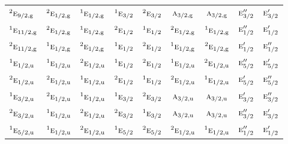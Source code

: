 \documentclass[10pt,a4paper]{article}
\numberwithin{equation}{section}
\newcommand{\irr}[1]{\text{\normalfont\scshape #1}}
\newcommand{\conjpair}[1]{{}^{#1}}
\newcommand{\ptag}[1]{\mathrm{#1}}
\begin{document}
{\begin{longtable}{@{}lcccccccc@{}}
$\conjpair{2}\irr{e}_{9/2,\ptag{g}}$ & $\conjpair{2}\irr{e}_{1/2,\ptag{g}}$ & $\conjpair{1}\irr{e}_{1/2,\ptag{g}}$ & $\conjpair{1}\irr{e}_{3/2}$ & $\conjpair{2}\irr{e}_{3/2}$ & $\irr{a}_{3/2,\ptag{g}}$ & $\irr{a}_{3/2,\ptag{g}}$ & $\irr{e}_{3/2}''$ & $\irr{e}_{3/2}'$\\
$\conjpair{1}\irr{e}_{11/2,\ptag{g}}$ & $\conjpair{2}\irr{e}_{1/2,\ptag{g}}$ & $\conjpair{1}\irr{e}_{1/2,\ptag{g}}$ & $\conjpair{2}\irr{e}_{1/2}$ & $\conjpair{1}\irr{e}_{1/2}$ & $\conjpair{2}\irr{e}_{1/2,\ptag{g}}$ & $\conjpair{1}\irr{e}_{1/2,\ptag{g}}$ & $\irr{e}_{1/2}''$ & $\irr{e}_{1/2}'$\\
$\conjpair{2}\irr{e}_{11/2,\ptag{g}}$ & $\conjpair{1}\irr{e}_{1/2,\ptag{g}}$ & $\conjpair{2}\irr{e}_{1/2,\ptag{g}}$ & $\conjpair{1}\irr{e}_{1/2}$ & $\conjpair{2}\irr{e}_{1/2}$ & $\conjpair{1}\irr{e}_{1/2,\ptag{g}}$ & $\conjpair{2}\irr{e}_{1/2,\ptag{g}}$ & $\irr{e}_{1/2}'$ & $\irr{e}_{1/2}''$\\
$\conjpair{1}\irr{e}_{1/2,\ptag{u}}$ & $\conjpair{1}\irr{e}_{1/2,\ptag{u}}$ & $\conjpair{2}\irr{e}_{1/2,\ptag{u}}$ & $\conjpair{1}\irr{e}_{1/2}$ & $\conjpair{2}\irr{e}_{1/2}$ & $\conjpair{1}\irr{e}_{1/2,\ptag{u}}$ & $\conjpair{2}\irr{e}_{1/2,\ptag{u}}$ & $\irr{e}_{5/2}''$ & $\irr{e}_{5/2}'$\\
$\conjpair{2}\irr{e}_{1/2,\ptag{u}}$ & $\conjpair{2}\irr{e}_{1/2,\ptag{u}}$ & $\conjpair{1}\irr{e}_{1/2,\ptag{u}}$ & $\conjpair{2}\irr{e}_{1/2}$ & $\conjpair{1}\irr{e}_{1/2}$ & $\conjpair{2}\irr{e}_{1/2,\ptag{u}}$ & $\conjpair{1}\irr{e}_{1/2,\ptag{u}}$ & $\irr{e}_{5/2}'$ & $\irr{e}_{5/2}''$\\
$\conjpair{1}\irr{e}_{3/2,\ptag{u}}$ & $\conjpair{2}\irr{e}_{1/2,\ptag{u}}$ & $\conjpair{1}\irr{e}_{1/2,\ptag{u}}$ & $\conjpair{1}\irr{e}_{3/2}$ & $\conjpair{2}\irr{e}_{3/2}$ & $\irr{a}_{3/2,\ptag{u}}$ & $\irr{a}_{3/2,\ptag{u}}$ & $\irr{e}_{3/2}'$ & $\irr{e}_{3/2}''$\\
$\conjpair{2}\irr{e}_{3/2,\ptag{u}}$ & $\conjpair{1}\irr{e}_{1/2,\ptag{u}}$ & $\conjpair{2}\irr{e}_{1/2,\ptag{u}}$ & $\conjpair{2}\irr{e}_{3/2}$ & $\conjpair{1}\irr{e}_{3/2}$ & $\irr{a}_{3/2,\ptag{u}}$ & $\irr{a}_{3/2,\ptag{u}}$ & $\irr{e}_{3/2}''$ & $\irr{e}_{3/2}'$\\
$\conjpair{1}\irr{e}_{5/2,\ptag{u}}$ & $\conjpair{1}\irr{e}_{1/2,\ptag{u}}$ & $\conjpair{2}\irr{e}_{1/2,\ptag{u}}$ & $\conjpair{1}\irr{e}_{5/2}$ & $\conjpair{2}\irr{e}_{5/2}$ & $\conjpair{2}\irr{e}_{1/2,\ptag{u}}$ & $\conjpair{1}\irr{e}_{1/2,\ptag{u}}$ & $\irr{e}_{1/2}''$ & $\irr{e}_{1/2}'$\\

\end{longtable}}
\end{document}
